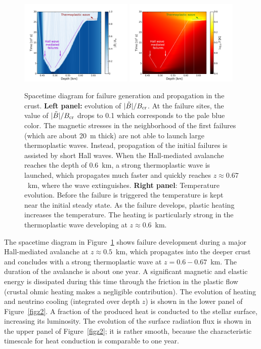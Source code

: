 \begin{figure}[htbp]
\centering
\includegraphics[width=0.48\textwidth]{pics/chap2/sp2.pdf}
\includegraphics[width=0.48\textwidth]{pics/chap2/sp2_1.pdf} 

\caption[Spacetime diagram for failure generation and propagation in the crust]{Spacetime diagram for failure generation and propagation in the crust. 
\textbf{Left panel:} evolution of $|\tilde{B}|/B_{\rm cr}$.
At the failure sites, the value of $|\tilde{B}|/B_{\rm cr}$ drops to 0.1 which 
corresponds to the pale blue color.
The magnetic stresses in the neighborhood of the first failures (which are about 20~m thick) are not able to launch large thermoplastic waves. Instead, propagation of the initial failures is assisted by short Hall waves.
When the Hall-mediated avalanche reaches the depth of 0.6~km, a strong thermoplastic wave is launched, which propagates much faster and quickly reaches $z\approx 0.67$~km, where the wave extinguishes.
\textbf{Right panel}: 
Temperature evolution. Before the failure is triggered 
the temperature is kept near the initial steady state. 
As the failure develops, plastic heating increases the temperature. The heating is particularly strong in the thermoplastic wave developing at $z\approx 0.6$~km.
}
\label{sp2}
\end{figure}

The spacetime diagram in Figure~\ref{sp2} shows failure development during a major 
Hall-mediated avalanche at $z\approx 0.5$~km, which propagates into the deeper crust and concludes with a strong thermoplastic wave at $z=0.6-0.67$~km.
The duration of the avalanche is about one year.
A significant magnetic and elastic energy is dissipated during this time through the friction in the plastic flow (crustal ohmic heating makes a negligible contribution). 
The evolution of heating and neutrino cooling (integrated over depth $z$) is shown in the lower panel of Figure~\ref{figz2}. 
A fraction of the produced heat is conducted to the stellar surface, increasing its luminosity. 
The evolution of the surface radiation flux is shown in the upper panel of Figure~\ref{figz2}; it is rather smooth, because the characteristic timescale for heat conduction is comparable to one year.

